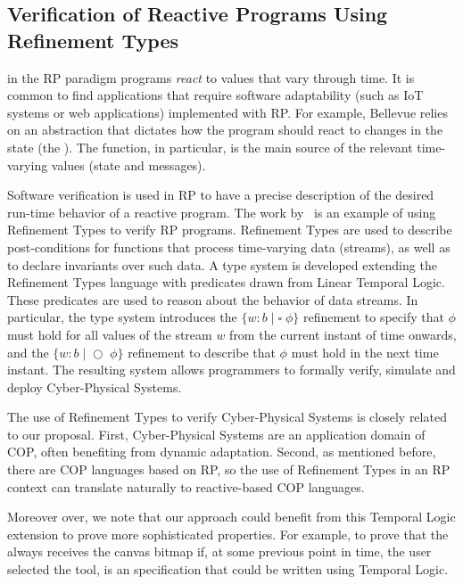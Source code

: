 \subsection{Verification of Reactive Programs Using Refinement Types}
\label{sec:verification-reactive-programming}

in the \ac{RP} paradigm programs \emph{react} to values that vary through time.
It is common to find applications that require software adaptability (such as IoT systems or web 
applications) implemented with \ac{RP}. For example, Bellevue relies on an abstraction that dictates how 
the program should react to changes in the state (the ). The  
function, in particular, is the main source of the relevant time-varying values (state and messages).

Software verification is used in \ac{RP} to have a precise description of the desired run-time behavior of 
a reactive program. The work by~\citet{chen24} is an example of using Refinement Types to verify \ac{RP} programs. Refinement Types are used 
to describe post-conditions for functions that process time-varying data (\ie streams), as well as to 
declare invariants over such data. A type system is developed extending the Refinement Types 
language with predicates drawn from Linear Temporal Logic. These predicates are used to reason 
about the behavior of data streams. In particular, the type system introduces the 
$\{ w : b \; | \; \square \; \phi \}$ refinement to specify that $\phi$ must hold for all values of the stream 
$w$ from the current instant of time onwards, and the $\{ w : b \; | \; \bigcirc \; \phi \}$ refinement to 
describe that $\phi$ must hold in the next time instant. The resulting system allows programmers to 
formally verify, simulate and deploy Cyber-Physical Systems.

The use of Refinement Types to verify Cyber-Physical Systems is closely related to our proposal. First, 
Cyber-Physical Systems are an application domain of \ac{COP}, often benefiting from dynamic 
adaptation. Second, as mentioned before, there are \ac{COP} languages based on \ac{RP}, so the use 
of Refinement Types in an \ac{RP} context can translate naturally to reactive-based \ac{COP} 
languages. 

Moreover over, we note that our approach could benefit from this Temporal Logic extension to prove 
more sophisticated properties. For example, to prove that the  always receives 
the canvas bitmap if, at some previous point in time, the user selected the  tool, is an 
specification that could be written using Temporal Logic.


